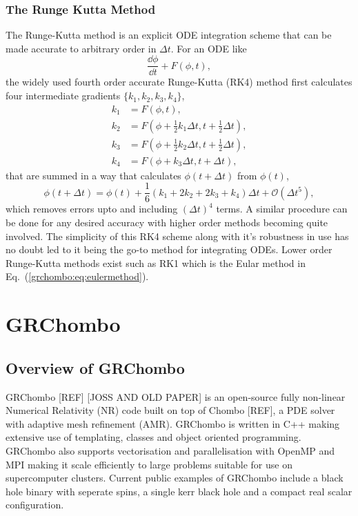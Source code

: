 \subsubsection{The Runge Kutta Method} \label{grchombo:sec:rk4}
The Runge-Kutta method is an explicit ODE integration scheme that can be made accurate to arbitrary order in $\Delta t$. For an ODE like
\begin{equation}
\frac{\dd \phi}{ \dd t} + F(\phi,t),
\end{equation}
the widely used fourth order accurate Runge-Kutta (RK4) method first calculates four intermediate gradients $\{k_1,k_2,k_3,k_4\}$,
\begin{align}
k_1 &=  F(\phi,t) ,\\
k_2 &=  F(\phi + \frac{1}{2}k_1 \Delta t,t+ \frac{1}{2} \Delta t) ,\\
k_3 &=  F(\phi + \frac{1}{2}k_2 \Delta t,t+ \frac{1}{2} \Delta t) ,\\
k_4 &=  F(\phi + k_3 \Delta t,t+  \Delta t) ,
\end{align}
that are summed in a way that calculates $\phi(t+\Delta t)$ from $\phi(t)$,
\begin{equation}
\phi(t+\Delta t) = \phi(t) + \frac{1}{6}\left( k_1 + 2k_2 + 2k_3 + k_4\right)\Delta t + \mathcal{O}(\Delta t^5),
\end{equation}
which removes errors upto and including $(\Delta t)^4$ terms. A similar procedure can be done for any desired accuracy with higher order methods becoming quite involved. The simplicity of this RK4 scheme along with it's robustness in use has no doubt led to it being the go-to method for integrating ODEs. Lower order Runge-Kutta methods exist such as RK1 which is the Eular method in Eq.~(\ref{grchombo:eq:eulermethod}).



\section{GRChombo}
\subsection{Overview of GRChombo}

GRChombo [REF] [JOSS AND OLD PAPER] is an open-source fully non-linear Numerical Relativity (NR) code built on top of Chombo [REF], a PDE solver with adaptive mesh refinement (AMR). GRChombo is written in C++ making extensive use of templating, classes and object oriented programming. GRChombo also supports vectorisation and parallelisation with OpenMP and MPI making it scale efficiently to large problems suitable for use on supercomputer clusters. Current public examples of GRChombo include a black hole binary with seperate spins, a single kerr black hole and a compact real scalar configuration. 

